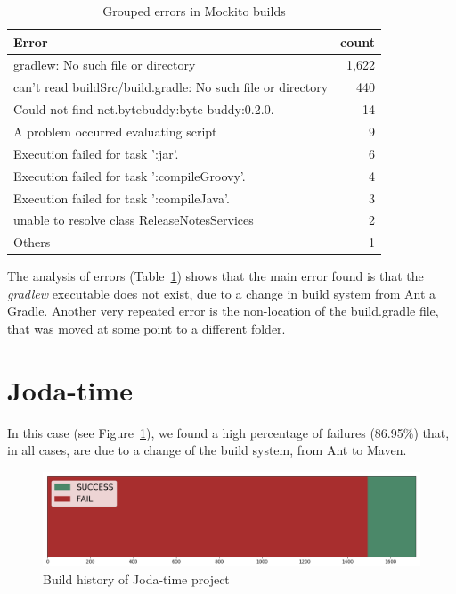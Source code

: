 \begin{table}
	\caption{Grouped errors in Mockito builds}
	\label{table:mockitoErrors}
	\begin{center}
	\begin{tabular}{lr}
		\toprule
		\bf{Error} & \bf{count} \\ 
		\midrule
			gradlew: No such file or directory & 1,622 \\
			can't read buildSrc/build.gradle: No such file or directory & 440 \\
			Could not find net.bytebuddy:byte-buddy:0.2.0. & 14 \\
			A problem occurred evaluating script & 9 \\
			Execution failed for task ':jar'. & 6 \\
			Execution failed for task ':compileGroovy'.& 4 \\
			Execution failed for task ':compileJava'. &	3 \\
			unable to resolve class ReleaseNotesServices & 2 \\
			Others & 1 \\
		\bottomrule
	\end{tabular}
	\end{center}
\end{table}

The analysis of errors (Table~\ref{table:mockitoErrors}) shows that the main error found is that the \emph{gradlew} executable does not exist, due to a change in build system from Ant a Gradle.
Another very repeated error is the non-location of the build.gradle file, that was moved at some point to a different folder.


\section{Joda-time}

In this case (see Figure~\ref{fig:timeHist}), we found a high percentage of failures (86.95\%) that, in all cases, are due to a change of the build system, from Ant to Maven.

\begin{figure}[h]
	\begin{center}
		\includegraphics[width=\linewidth]{img/charts/TimeHist}
		\caption{Build history of Joda-time project}
		\label{fig:timeHist}
	\end{center}
\end{figure}

